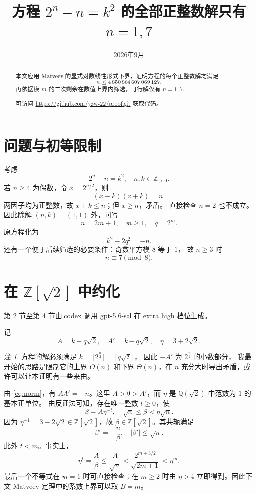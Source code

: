\documentclass[11pt,a4paper]{ctexart}
\title{方程 \(2^n-n=k^2\) 的全部正整数解只有 \(n=1,7\)}
\author{}
\date{2026年9月}
\theoremstyle{remark}
\newtheorem{remark}[theorem]{注}
\newcommand{\Q}{\mathbb Q}
\newcommand{\Z}{\mathbb Z}
\begin{document}
\maketitle

\begin{abstract}
本文应用 Matveev 的显式对数线性形式下界，证明方程的每个正整数解均满足
\[ n\le 4\,850\,864\,607\,069\,127. \]
再依据模 $m$ 的二次剩余在数值上界内筛选，可行解仅有 $n=1,7$.

可访问 \url{https://github.com/yzw-22/proof.git} 获取代码。
\end{abstract}

\section{问题与初等限制}
考虑
\begin{equation}\label{eq:main}
2^n-n=k^2,\quad n,k\in\Z_{>0}.
\end{equation}
若 \(n\ge4\) 为偶数，令 \(x=2^{n/2}\)，则
\[ (x-k)(x+k)=n. \]
两因子均为正整数，故 \(x+k\le n\)；但 \(x\ge n\)，矛盾。
直接检查 \(n=2\) 也不成立。因此除解 \((n,k)=(1,1)\) 外，可写
\begin{equation}\label{eq:mq}
n=2m+1,\quad m\ge1,\quad q=2^m.
\end{equation}
原方程化为
\begin{equation}\label{eq:norm}
k^2-2q^2=-n.
\end{equation}
还有一个便于后续筛选的必要条件：奇数平方模 \(8\) 等于 \(1\)，
故 \(n\ge3\) 时
\begin{equation}\label{eq:mod8}
n\equiv7\pmod 8.
\end{equation}

\section{在 \texorpdfstring{\(\Z[\sqrt2]\)}{Z[sqrt(2)]} 中约化}
第 2 节至第 4 节由 codex 调用 gpt-5.6-sol 在 extra high 档位生成。

记
\[ A=k+q\sqrt2,\quad A'=k-q\sqrt2,\quad \eta=3+2\sqrt2. \]
\begin{remark}
方程的解必须满足 $k=\lfloor2^{\frac{n}{2}}\rfloor=\lfloor q\sqrt{2}\rfloor$，
因此 $-A'$ 为 $2^{\frac{n}{2}}$ 的小数部分，
我最开始的思路是限制它的上界 $O(n)$ 和下界 $\Theta(n)$，在 $n$ 充分大时导出矛盾，或许可以让本证明有一些来由。
\end{remark}

由 \eqref{eq:norm}，有 \(AA'=-n\)。这里 \(A>0>A'\)，而 \(\eta\) 是 \(\Q(\sqrt2)\) 中范数为 \(1\) 的基本正单位。
由反证法可知，存在唯一整数 \(t\ge0\)，使
\begin{equation}\label{eq:reduction}
\beta=A\eta^{-t},\quad \sqrt n\le\beta<\eta\sqrt n.
\end{equation}
因为 \(\eta^{-1}=3-2\sqrt2\in\Z[\sqrt2]\)，故 \(\beta\in\Z[\sqrt2]\)。其共轭满足
\begin{equation}\label{eq:beta-conj}
\beta'=-\frac n\beta,\quad |\beta'|\le\sqrt n.
\end{equation}
此外 \(t<m\)。事实上，
\[ \eta^t=\frac A\beta\le \frac{A}{\sqrt{n}}< \frac{2^{m+3/2}}{\sqrt{2m+1}}<\eta^m. \]
最后一个不等式在 \(m=1\) 时可直接检查；在 \(m\ge2\) 时由 \(\eta>4\) 立即得到。因此下文 Matveev 定理中的系数上界可以取 \(B=m\)。
\end{document}

